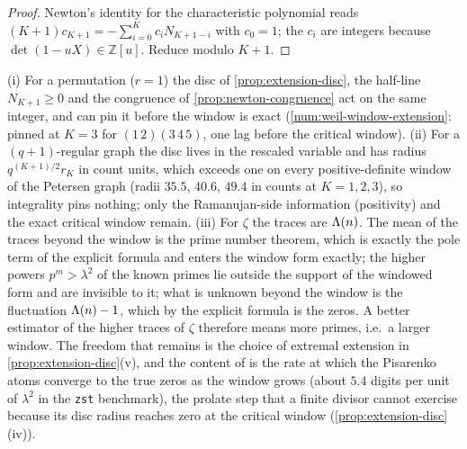 \begin{proof}
Newton's identity for the characteristic polynomial reads
$(K+1)c_{K+1} = -\sum_{i=0}^{K}c_iN_{K+1-i}$ with $c_0 = 1$; the $c_i$ are integers because
$\det(1-uX)\in\mathbb Z[u]$. Reduce modulo $K+1$.
\end{proof}

\begin{observation}
\label{obs:rescaling-and-zeta}
(i) For a permutation ($r = 1$) the disc of \cref{prop:extension-disc}, the half-line
$N_{K+1}\ge0$ and the congruence of \cref{prop:newton-congruence} act on the same integer, and
can pin it before the window is exact (\cref{num:weil-window-extension}: pinned at $K = 3$ for
$(1\,2)(3\,4\,5)$, one lag before the critical window). (ii) For a $(q+1)$-regular graph the disc
lives in the rescaled variable and has radius $q^{(K+1)/2}r_K$ in count units, which exceeds one
on every positive-definite window of the Petersen graph (radii $35.5$, $40.6$, $49.4$ in counts
at $K = 1,2,3$), so integrality pins nothing; only the Ramanujan-side information (positivity) and
the exact critical window remain. (iii) For $\zeta$ the traces are $\Lambda(n)$. The mean of the
traces beyond the window is the prime number theorem, which is exactly the pole term of the
explicit formula and enters the window form exactly; the higher powers $p^m > \lambda^2$ of the
known primes lie outside the support of the windowed form and are invisible to it; what is
unknown beyond the window is the fluctuation $\Lambda(n) - 1$, which by the explicit formula is
the zeros. A better estimator of the higher traces of $\zeta$ therefore means more primes, i.e.\ a
larger window. The freedom that remains is the choice of extremal extension in
\cref{prop:extension-disc}(v), and the content of \cite{connes2025zeta} is the rate at which the
Pisarenko atoms converge to the true zeros as the window grows (about $5.4$ digits per unit of
$\lambda^2$ in the \texttt{zst} benchmark), the prolate step that a finite divisor cannot
exercise because its disc radius reaches zero at the critical window
(\cref{prop:extension-disc}(iv)).
\end{observation}

